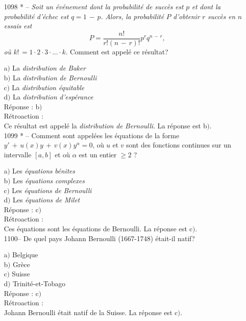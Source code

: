 ﻿\documentclass[letterpaper, 12pt]{article}
\begin{document}
1098 * -- {\sl Soit un \'ev\'enement dont la probabilit\'e de
succ\`es est $p$ et dont la probabilit\'e d'\'echec est $q=1\,-\,p$.
Alors, la probabilit\'e $P$ d'obtenir $r$ succ\`es en $n$ essais est
$$\displaystyle{P=\frac{n!}{r!(n\,-\,r)!}p^rq^{n\,-\,r}},$$
o\`u $k!\,=1\cdot2\cdot3\cdot\ldots\cdot k$}. Comment est appel\'e
ce r\'esultat?

a$)$ La {\sl distribution de Baker} \\
b$)$ La {\sl distribution de Bernoulli}   \\
c$)$ La {\sl distribution \'equitable}  \\
d$)$ La {\sl distribution d'esp\'erance}\\

R\'eponse : b$)$\\

R\'etroaction : \\
Ce r\'esultat est appel\'e la {\sl distribution de Bernoulli}.
La r\'eponse est b$)$.\\

1099 * -- Comment sont appel\'ees les \'equations de la forme
$y'\,+\,u(x)y\,+\,v(x)y^{\alpha}=0$, o\`u $u$ et $v$ sont des
fonctions continues sur un intervalle $[a,b]$ et o\`u $\alpha$ est
un entier $\ge2$ ?

a$)$ Les {\sl\'equations b\'enites} \\
b$)$ Les {\sl\'equations complexes}  \\
c$)$ Les {\sl\'equations de Bernoulli}  \\
d$)$ Les {\sl\'equations de Milet}\\

R\'eponse : c$)$\\

R\'etroaction : \\
Ces \'equations sont les \'equations de Bernoulli.
La r\'eponse est c$)$.\\

1100-- De quel pays Johann Bernoulli (1667-1748) \'etait-il natif?

a$)$ Belgique \\
b$)$ Gr\`ece  \\
c$)$ Suisse  \\
d$)$ Trinit\'e-et-Tobago \\

R\'eponse : c$)$\\

R\'etroaction : \\
Johann Bernoulli \'etait natif de la Suisse.
La r\'eponse est c$)$.\\
\end{document}
